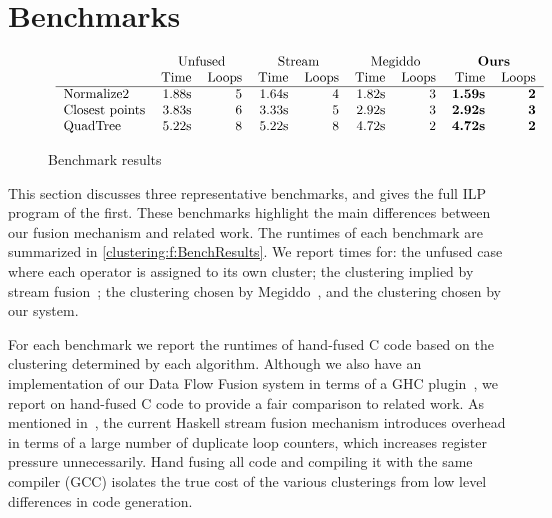 \section{Benchmarks}
\label{clustering:s:Benchmarks}

\begin{figure*}
$$\begin{array}{c}

\begin{tabular}{lrrrrrrrr}
                & \multicolumn{2}{c}{Unfused}         & \multicolumn{2}{c}{Stream}
                & \multicolumn{2}{c}{Megiddo} &\multicolumn{2}{c}{\textbf{Ours}} \\
                & Time & Loops   & Time & Loops      & Time & Loops & Time & Loops   \\
\hline
Normalize2      & 1.88s & 5      & 1.64s & 4          & 1.82s & 3  & \textbf{1.59s} & \textbf{2}\\
Closest points  & 3.83s & 6      & 3.33s & 5          & 2.92s & 3  & \textbf{2.92s} & \textbf{3}\\
QuadTree        & 5.22s & 8      & 5.22s & 8          & 4.72s & 2  & \textbf{4.72s} & \textbf{2}\\
\end{tabular}

\end{array}$$
\caption{Benchmark results}
\label{clustering:f:BenchResults}
\end{figure*}

This section discusses three representative benchmarks, and gives the full ILP program of the first. These benchmarks highlight the main differences between our fusion mechanism and related work. The runtimes of each benchmark are summarized in \autoref{clustering:f:BenchResults}. We report times for: the unfused case where each operator is assigned to its own cluster; the clustering implied by stream fusion~\cite{coutts2007stream}; the clustering chosen by Megiddo~\cite{megiddo1998optimal}, and the clustering chosen by our system. 

For each benchmark we report the runtimes of hand-fused C code based on the clustering determined by each algorithm. Although we also have an implementation of our Data Flow Fusion system in terms of a GHC plugin~\cite{lippmeier2013data}, we report on hand-fused C code to provide a fair comparison to related work. As mentioned in~\cite{lippmeier2013data}, the current Haskell stream fusion mechanism introduces overhead in terms of a large number of duplicate loop counters, which increases register pressure unnecessarily. Hand fusing all code and compiling it with the same compiler (GCC) isolates the true cost of the various clusterings from low level differences in code generation.


